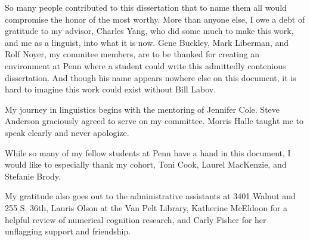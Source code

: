 So many people contributed to this dissertation that to name them all would compromise the honor of the most worthy. 
More than anyone else, I owe a debt of gratitude to my advisor, Charles Yang, 
who did some much to make this work, and me as a linguist,
into what it is now.
Gene Buckley, Mark Liberman, and Rolf Noyer, my commitee members, are to be thanked for creating an environment at Penn where a student could write this admittedly contenious dissertation. 
And though his name appears nowhere else on this document, it is hard to imagine this work could exist without Bill Labov.

My journey in linguistics begins with the mentoring of Jennifer Cole.
Steve Anderson graciously agreed to serve on my committee.
Morris Halle taught me to speak clearly and never apologize.

While so many of my fellow students at Penn have a hand in this document, 
I would like to especially thank my cohort, Toni Cook, Laurel MacKenzie, and Stefanie Brody.


My gratitude also goes out to the administrative assistants at 3401 Walnut and 255 S. 36th, Lauris Olson at the Van Pelt Library, Katherine McEldoon for a helpful review of numerical cognition research, and Carly Fisher for her unflagging support and friendship.
